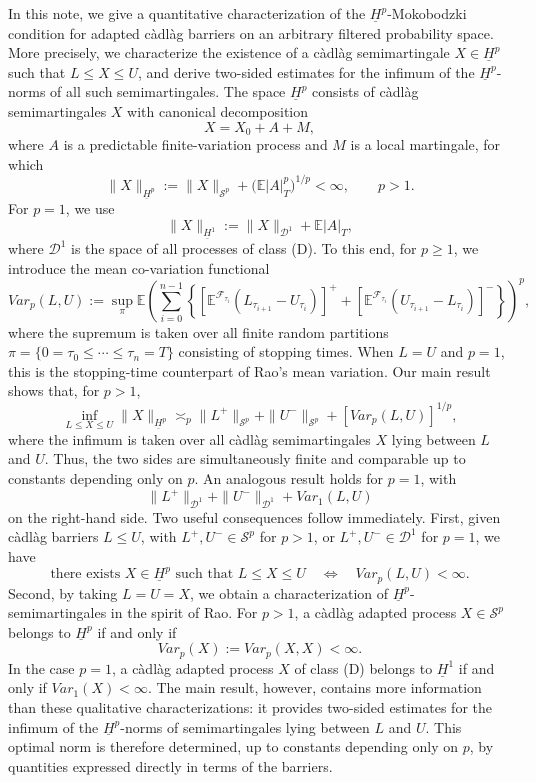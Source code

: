 \documentclass[11pt,a4paper,reqno]{amsart}
\theoremstyle{definition}
\numberwithin{equation}{section}
\begin{document}
In this note, we give a quantitative characterization of the
$\underline H^p$-Mokobodzki condition for adapted c\`adl\`ag barriers on an
arbitrary filtered probability space. More precisely, we characterize the
existence of a c\`adl\`ag semimartingale $X\in\underline H^p$ such that
$L\leq X\leq U$, and derive two-sided estimates for the infimum of the
$\underline H^p$-norms of all such semimartingales.
The space $\underline H^p$ consists of c\`adl\`ag semimartingales $X$
with canonical decomposition
\[
X=X_0+A+M,
\]
where $A$ is a predictable finite-variation process and $M$ is a local
martingale, for which
\[
\|X\|_{\underline H^p}
:=
\|X\|_{\mathcal S^p}
+\big(\mathbb E|A|_T^p\big)^{1/p}<\infty,
\qquad p>1.
\]
For $p=1$, we use
\[
\|X\|_{\underline H^1}
:=
\|X\|_{\mathcal D^1}+\mathbb E|A|_T,
\]
where $\mathcal D^1$ is the space of all processes of class \textnormal{(D)}.
To this end, for $p\geq1$, we introduce the mean co-variation functional
\begin{equation}
\label{eq.func1}
Var_p(L,U):=
\sup_{\pi}\mathbb E
\left(
\sum_{i=0}^{n-1}
\left\{
\left[
\mathbb E^{\mathcal F_{\tau_i}}
(L_{\tau_{i+1}}-U_{\tau_i})
\right]^+
+
\left[
\mathbb E^{\mathcal F_{\tau_i}}
(U_{\tau_{i+1}}-L_{\tau_i})
\right]^-
\right\}
\right)^p,
\end{equation}
where the supremum is taken over all finite random partitions
$\pi=\{0=\tau_0\leq\cdots\leq\tau_n=T\}$ consisting of stopping times.
When $L=U$ and $p=1$, this is the stopping-time counterpart of Rao's
mean variation.
Our main result shows that, for $p>1$,
\[
\inf_{L\leq X\leq U}\|X\|_{\underline H^p}
\asymp_p
\|L^+\|_{\mathcal S^p}
+\|U^-\|_{\mathcal S^p}
+[Var_p(L,U)]^{1/p},
\]
where the infimum is taken over all c\`adl\`ag semimartingales $X$ lying
between $L$ and $U$. Thus, the two sides are simultaneously finite and comparable 
up to constants depending only on $p$. An analogous
result holds for $p=1$, with
\[
\|L^+\|_{\mathcal D^1}
+\|U^-\|_{\mathcal D^1}
+Var_1(L,U)
\]
on the right-hand side.
Two useful consequences follow immediately. First, given c\`adl\`ag barriers
$L\leq U$, with $L^+,U^-\in\mathcal S^p$ for $p>1$, or
$L^+,U^-\in\mathcal D^1$ for $p=1$, we have
\[
\text{there exists }X\in\underline H^p\text{ such that }L\leq X\leq U
\quad\Longleftrightarrow\quad
Var_p(L,U)<\infty.
\]
Second, by taking $L=U=X$, we obtain a characterization of
$\underline H^p$-semimartingales in the spirit of Rao. For $p>1$, a
c\`adl\`ag adapted process $X\in\mathcal S^p$ belongs to
$\underline H^p$ if and only if
\[
Var_p(X):=Var_p(X,X)<\infty.
\]
In the case  $p=1$, a c\`adl\`ag adapted process $X$ of class
\textnormal{(D)} belongs to $\underline H^1$ if and only if
$Var_1(X)<\infty$.
The main result, however, contains more information than these qualitative
characterizations: it provides two-sided estimates for the infimum of the
$\underline H^p$-norms of semimartingales lying between $L$ and $U$.
This optimal norm is therefore determined, up to constants depending only
on $p$, by quantities expressed directly in terms of the barriers.
\end{document}
